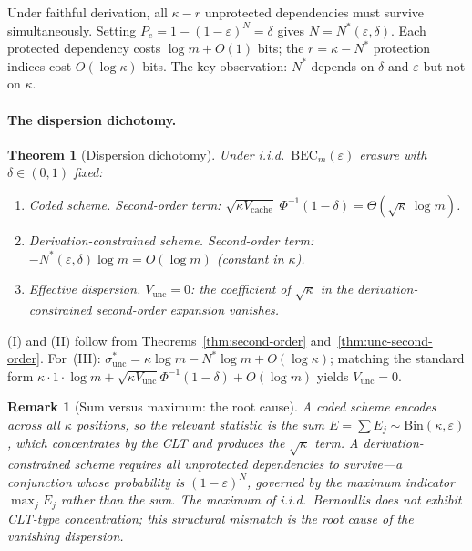 \documentclass[journal]{IEEEtran}
\makeatletter
\newtheorem{theorem}{Theorem}[section]
\newtheorem{remark}{Remark}[section]
\numberwithin{equation}{section}
\renewenvironment{proof}[1][\proofname]{\par
  \pushQED{\qed}%
  \normalfont \topsep6\p@\@plus6\p@\relax
  \trivlist
  \item[\hskip\labelsep
        \itshape
    #1\@addpunct{.}]\ignorespaces
}{%
  \popQED\endtrivlist\@endpefalse
}
\makeatother
\begin{document}
\begin{proof}
Under faithful derivation, all $\kappa{-}r$ unprotected
dependencies must survive simultaneously.
Setting $P_e=1{-}(1{-}\varepsilon)^N=\delta$ gives
$N=N^*(\varepsilon,\delta)$.
Each protected dependency costs $\log m+O(1)$ bits; the
$r=\kappa{-}N^*$ protection indices cost
$O(\log\kappa)$ bits.
The key observation: $N^*$ depends on $\delta$ and
$\varepsilon$ but not on $\kappa$.
\end{proof}

\paragraph{The dispersion dichotomy.}

\begin{theorem}[Dispersion dichotomy]
\label{thm:dispersion-dichotomy}
Under i.i.d.\ $\mathrm{BEC}_m(\varepsilon)$ erasure with
$\delta\in(0,1)$ fixed:

\begin{enumerate}[label=\textup{(\Roman*)}]
\item \emph{Coded scheme.}\;
Second-order term:
$\sqrt{\kappa V_{\mathrm{cache}}}\;
\Phi^{-1}(1{-}\delta)
=\Theta(\sqrt\kappa\,\log m)$.

\item \emph{Derivation-constrained scheme.}\;
Second-order term:
$-N^*(\varepsilon,\delta)\log m=O(\log m)$
(constant in $\kappa$).

\item \emph{Effective dispersion.}\;
$V_{\mathrm{unc}}=0$:
the coefficient of $\sqrt\kappa$ in the
derivation-constrained second-order expansion vanishes.
\end{enumerate}
\end{theorem}

\begin{proof}
(I) and (II) follow from
Theorems~\ref{thm:second-order}
and~\ref{thm:unc-second-order}.
For~(III): $\sigma^*_{\mathrm{unc}}
=\kappa\log m-N^*\log m+O(\log\kappa)$;
matching the standard form
$\kappa\cdot 1\cdot\log m
+\sqrt{\kappa V_{\mathrm{unc}}}\Phi^{-1}(1{-}\delta)
+O(\log m)$
yields $V_{\mathrm{unc}}=0$.
\end{proof}

\begin{remark}[Sum versus maximum: the root cause]
\label{rem:dispersion-physical}
A coded scheme encodes across all $\kappa$ positions, so the
relevant statistic is the \emph{sum}
$E=\sum E_j\sim\mathrm{Bin}(\kappa,\varepsilon)$,
which concentrates by the CLT and produces the $\sqrt\kappa$
term.
A derivation-constrained scheme requires \emph{all}
unprotected dependencies to survive---a conjunction whose
probability is $(1{-}\varepsilon)^N$, governed by the
\emph{maximum} indicator $\max_j E_j$ rather than the sum.
The maximum of i.i.d.\ Bernoullis does not exhibit CLT-type
concentration; this structural mismatch is the root cause of
the vanishing dispersion.
\end{remark}
\end{document}
